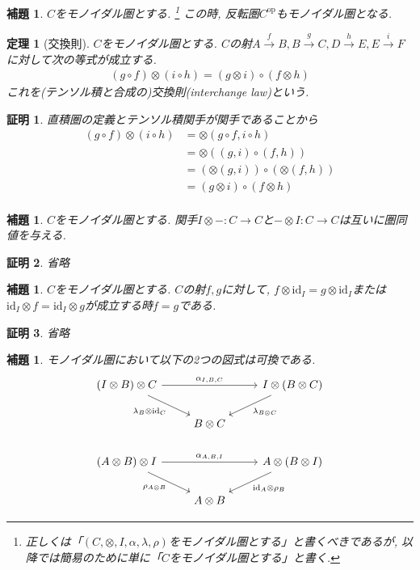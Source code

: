 \documentclass[a4paper,12pt]{ltjsarticle}
\theoremstyle{break}
\newtheorem{lem}[thm]{補題}
\newtheorem{thrm}[thm]{定理}
\newtheorem*{prf}{証明}
\newcommand{\Op}{\mathrm{op}}
\newcommand{\xr}[1]{\xrightarrow{#1}}
\newcommand{\id}{\mathrm{id}}
\newcommand{\ci}{\circ}
\newcommand{\al}{\alpha}
\newcommand{\la}{\lambda}
\newcommand{\ot}{\otimes}
\numberwithin{equation}{section}
\begin{document}
\begin{lem}
  $C$をモノイダル圏とする.
  \footnote{
    正しくは「$(C,\ot,I,\al,\la,\rho)$をモノイダル圏とする」と書くべきであるが, 以降では簡易のために単に「$C$をモノイダル圏とする」と書く. 
  } 
  この時, 反転圏$C^{\Op}$もモノイダル圏となる. 
\end{lem}

\begin{thrm}[交換則]
  $C$をモノイダル圏とする. $C$の射$A \xr{f} B, B \xr{g} C, D \xr{h} E, E \xr{i} F$に対して次の等式が成立する. 
  \begin{align*}
    (g \ci f) \ot (i \ci h) = (g \ot i) \ci (f \ot h)
  \end{align*}
  これを(テンソル積と合成の)交換則(interchange law)という. 
\end{thrm}

\begin{prf}
  直積圏の定義とテンソル積関手が関手であることから
  \begin{align*}
    (g \ci f) \ot (i \ci h)
    &= \ot(g \ci f, i \ci h) \\
    &= \ot((g,i) \ci (f,h)) \\
    &= (\ot(g,i)) \ci (\ot(f,h)) \\
    &= (g \ot i) \ci (f \ot h) \\
  \end{align*}
\end{prf}

\begin{lem}
  $C$をモノイダル圏とする. 
  関手$I \ot -: C \to C$と$- \ot I: C \to C$は互いに圏同値を与える. 
\end{lem}

\begin{prf}
  省略
\end{prf}

\begin{lem}
  $C$をモノイダル圏とする. 
  $C$の射$f,g$に対して, $f \ot \id_I=g \ot \id_I$または$\id_I \ot f=\id_I \ot g$が成立する時$f=g$である. 
\end{lem}

\begin{prf}
  省略
\end{prf}

\begin{lem}
  モノイダル圏において以下の2つの図式は可換である. 
  \[\begin{tikzcd}
    {(I \ot B) \ot C} && {I \ot (B \ot C)} \\
    & {B \ot C} \\
    {(A \ot B) \ot I} && {A \ot (B \ot I)} \\
    & {A \ot B}
    \arrow["{\al_{I,B,C}}", from=1-1, to=1-3]
    \arrow["{\la_B \ot \id_C}"', from=1-1, to=2-2]
    \arrow["{\al_{A,B,I}}", from=3-1, to=3-3]
    \arrow["{\id_A \ot \rho_B}", from=3-3, to=4-2]
    \arrow["{\rho_{A \ot B}}"', from=3-1, to=4-2]
    \arrow["{\la_{B \ot C}}", from=1-3, to=2-2]
  \end{tikzcd}\]
\end{lem}
\end{document}
